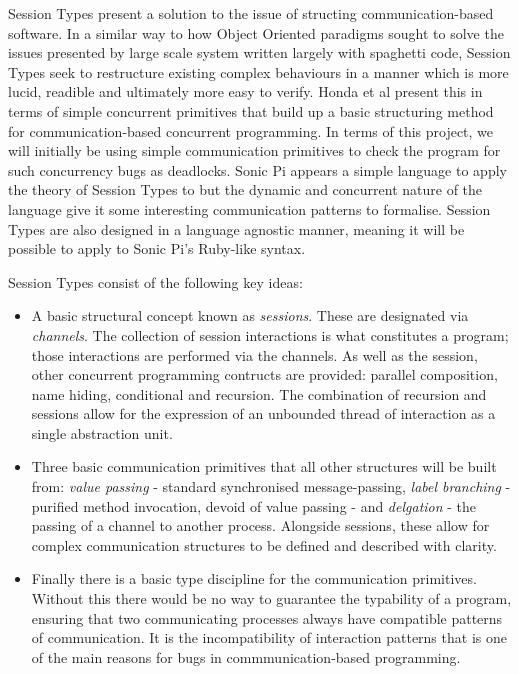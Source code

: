 \documentclass[11pt]{scrartcl}
\begin{document}
Session Types present a solution to the issue of structing communication-based 
software. In a similar way to how Object Oriented paradigms sought to solve 
the issues presented by large scale system written largely with spaghetti 
code, Session Types seek to restructure existing complex behaviours in a 
manner which is more lucid, readible and ultimately more easy to verify. Honda 
et al \cite{HVM98} present this in terms of simple concurrent primitives that 
build up a basic structuring method for communication-based concurrent 
programming. In terms of this project, we will initially be using simple 
communication primitives to check the program for such concurrency bugs as 
deadlocks. Sonic Pi appears a simple language to apply the theory of Session 
Types to but the dynamic and concurrent nature of the language give it some 
interesting communication patterns to formalise. Session Types 
are also designed in a language agnostic manner, meaning it will be possible to 
apply to Sonic Pi's Ruby-like syntax.

Session Types consist of the following key ideas:

\begin{itemize}[noitemsep]
	\item A basic structural concept known as \emph{sessions}. These are designated 
	via \emph{channels}. The collection of session interactions is what constitutes a 
	program; those interactions are performed via the channels. As well as the 
	session, other concurrent programming contructs are provided: parallel 
	composition, name hiding, conditional and recursion. The combination of 
	recursion and sessions allow for the expression of an unbounded thread of 
	interaction as a single abstraction unit.

	\item Three basic communication primitives that all other structures will be 
	built from: \emph{value passing} - standard synchronised message-passing, 
	\emph{label branching} - purified method invocation, devoid of value passing - and 
	\emph{delgation} - the passing of a channel to another process. Alongside 
	sessions, these allow for complex communication structures to be defined and 
	described with clarity.

	\item Finally there is a basic type discipline for the communication primitives. 
	Without this there would be no way to guarantee the typability of a program, 
	ensuring that two communicating processes always have compatible patterns of 
	communication. It is the incompatibility of interaction patterns that is one 
	of the main reasons for bugs in commmunication-based programming.
\end{itemize}
\end{document}
